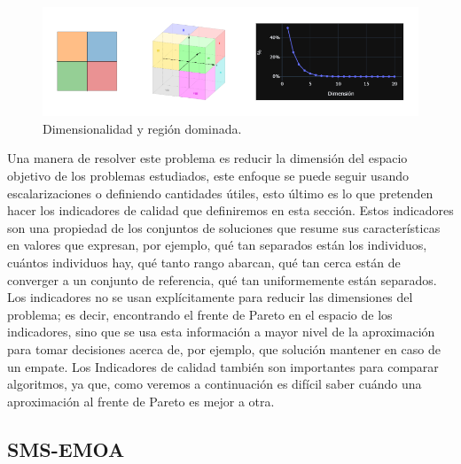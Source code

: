 \begin{figure}[H]
    \centering
    \includegraphics[width=\textwidth]{Figuras/maldicion_dimensionalidad.png}
    \caption[maldicion de la dimensionalidad]{Dimensionalidad y región dominada.}
    \label{fig:maldicion_dim}
\end{figure}

Una manera de resolver este problema es reducir la dimensión del espacio objetivo de los problemas estudiados, este enfoque se puede seguir usando escalarizaciones o definiendo cantidades útiles, esto último es lo que pretenden hacer los indicadores de calidad que definiremos en esta sección. Estos indicadores son una propiedad de los conjuntos de soluciones que resume sus características en valores que expresan, por ejemplo, qué tan separados están los individuos, cuántos individuos hay, qué tanto rango abarcan, qué tan cerca están de converger a un conjunto de referencia, qué tan uniformemente están separados. Los indicadores no se usan explícitamente para reducir las dimensiones del problema; es decir, encontrando el frente de Pareto en el espacio de los indicadores, sino que se usa esta información a mayor nivel de la aproximación para tomar decisiones acerca de, por ejemplo, que solución mantener en caso de un empate. Los Indicadores de calidad también son importantes para comparar algoritmos, ya que, como veremos a continuación es difícil saber cuándo una aproximación al frente de Pareto es mejor a otra. 

\subsection*{SMS-EMOA} \label{sec:SMS-EMOA}

